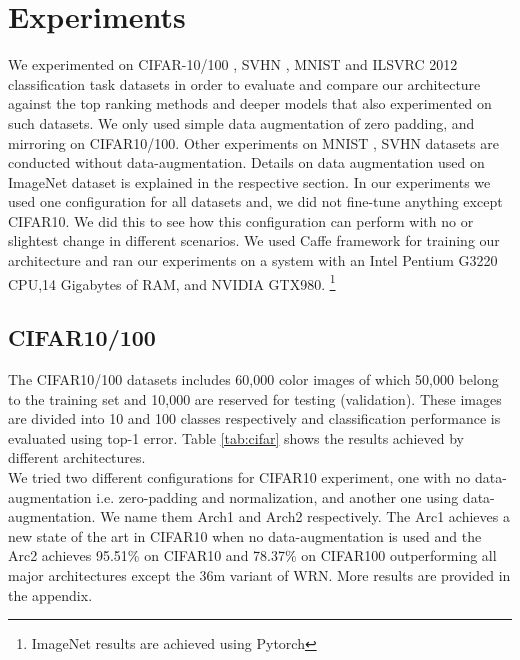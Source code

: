 \documentclass{article} \usepackage{lets_keepit_simple,times}
\begin{document}
\section{Experiments} \label{sec:exp}
We experimented on CIFAR-10/100 \cite{Krizhevsky_LearningMultipleLayers_2009}, SVHN \cite{Netzer_ReadingDigits_2011}, MNIST \cite{Lecun_GradientBased_CNN_1998} and ILSVRC 2012 classification task \cite{Russakovsky_ImageNet_2015} datasets in order to evaluate and compare our architecture against the top ranking methods and deeper models that also experimented on such datasets. We only used simple data augmentation of zero padding, and mirroring on CIFAR10/100. Other experiments on MNIST , SVHN datasets are conducted without data-augmentation. Details on data augmentation used on ImageNet dataset is explained in the respective section. In our experiments we used one configuration for all datasets and, we did not fine-tune anything except CIFAR10. We did this to see how this configuration can perform with no or slightest change in different scenarios. We used Caffe framework \cite{Jia_Caffe_2014} for training our architecture and ran our experiments on a system with an Intel Pentium G3220 CPU,14 Gigabytes of RAM, and NVIDIA GTX980. \footnote {ImageNet results are achieved using Pytorch}  
 
\subsection{CIFAR10/100}
The CIFAR10/100 \cite{Krizhevsky_LearningMultipleLayers_2009} datasets includes 60,000 color images of which 50,000 belong to the training set and 10,000 are reserved for testing (validation). These images are divided into 10 and 100 classes respectively and classification performance is evaluated using top-1 error. Table \ref{tab:cifar} shows the results achieved by different architectures.\\ 
We tried two different configurations for CIFAR10 experiment, one with no data-augmentation i.e. zero-padding and normalization, and another one using data-augmentation. We name them Arch1 and Arch2 respectively. The Arc1 achieves a new state of the art in CIFAR10 when no data-augmentation is used and the Arc2 achieves 95.51\% on CIFAR10 and 78.37\% on CIFAR100 outperforming all major architectures except the 36m variant of WRN. More results are provided in the appendix. 
\end{document}
